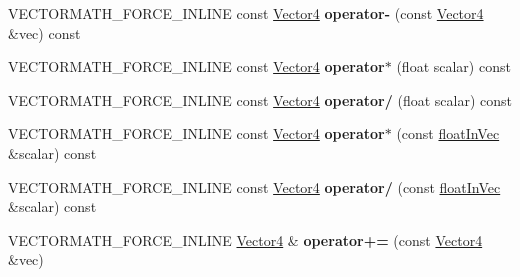 \begin{DoxyCompactItemize}
\mbox{\label{classVectormath_1_1Aos_1_1Vector4_a70627bff0b5d5c80dad2e3d9117779cf}} 
V\+E\+C\+T\+O\+R\+M\+A\+T\+H\+\_\+\+F\+O\+R\+C\+E\+\_\+\+I\+N\+L\+I\+NE const \hyperlink{classVectormath_1_1Aos_1_1Vector4}{Vector4} {\bfseries operator-\/} (const \hyperlink{classVectormath_1_1Aos_1_1Vector4}{Vector4} \&vec) const
\item 
\mbox{\label{classVectormath_1_1Aos_1_1Vector4_a24a69ae05a7f0c96e13c5c0a27030b3a}} 
V\+E\+C\+T\+O\+R\+M\+A\+T\+H\+\_\+\+F\+O\+R\+C\+E\+\_\+\+I\+N\+L\+I\+NE const \hyperlink{classVectormath_1_1Aos_1_1Vector4}{Vector4} {\bfseries operator$\ast$} (float scalar) const
\item 
\mbox{\label{classVectormath_1_1Aos_1_1Vector4_a96d0690412407aca6ba0eab8c582aa54}} 
V\+E\+C\+T\+O\+R\+M\+A\+T\+H\+\_\+\+F\+O\+R\+C\+E\+\_\+\+I\+N\+L\+I\+NE const \hyperlink{classVectormath_1_1Aos_1_1Vector4}{Vector4} {\bfseries operator/} (float scalar) const
\item 
\mbox{\label{classVectormath_1_1Aos_1_1Vector4_aaf87d624e576bb033c7e1de24826d869}} 
V\+E\+C\+T\+O\+R\+M\+A\+T\+H\+\_\+\+F\+O\+R\+C\+E\+\_\+\+I\+N\+L\+I\+NE const \hyperlink{classVectormath_1_1Aos_1_1Vector4}{Vector4} {\bfseries operator$\ast$} (const \hyperlink{classVectormath_1_1floatInVec}{float\+In\+Vec} \&scalar) const
\item 
\mbox{\label{classVectormath_1_1Aos_1_1Vector4_a741b9c66d4715daf8a40f732523f628e}} 
V\+E\+C\+T\+O\+R\+M\+A\+T\+H\+\_\+\+F\+O\+R\+C\+E\+\_\+\+I\+N\+L\+I\+NE const \hyperlink{classVectormath_1_1Aos_1_1Vector4}{Vector4} {\bfseries operator/} (const \hyperlink{classVectormath_1_1floatInVec}{float\+In\+Vec} \&scalar) const
\item 
\mbox{\label{classVectormath_1_1Aos_1_1Vector4_ae24d5950c0c5eb7f00d07b8cb6f652c5}} 
V\+E\+C\+T\+O\+R\+M\+A\+T\+H\+\_\+\+F\+O\+R\+C\+E\+\_\+\+I\+N\+L\+I\+NE \hyperlink{classVectormath_1_1Aos_1_1Vector4}{Vector4} \& {\bfseries operator+=} (const \hyperlink{classVectormath_1_1Aos_1_1Vector4}{Vector4} \&vec)
\item 
\mbox{\label{classVectormath_1_1Aos_1_1Vector4_ab9a663764d89cf57d19fbf93034c1282}} 

\end{DoxyCompactItemize}
